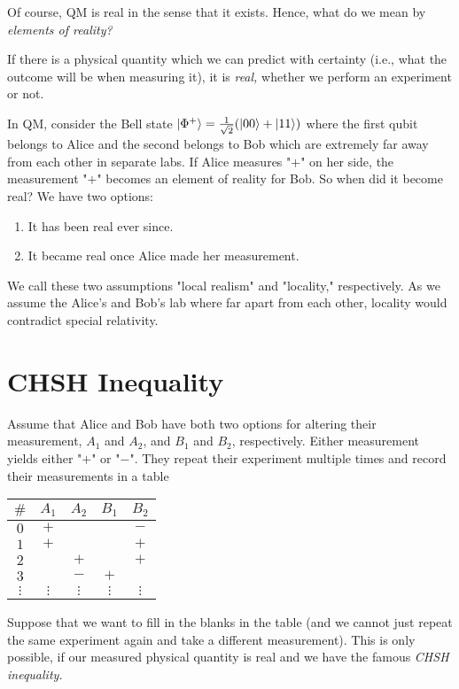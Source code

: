 	Of course, \ac{QM} is real in the sense that it exists. Hence, what do we mean by \emph{elements of reality?}
	\begin{definition}  \label{def:real}
		If there is a physical quantity which we can predict with certainty (i.e., what the outcome will be when measuring it), it is \emph{real,} whether we perform an experiment or not.
	\end{definition}
	In \ac{QM}, consider the Bell state \( \ket{\Phi^+} = \frac{1}{\sqrt{2}} (\ket{00} + \ket{11}) \) where the first qubit belongs to Alice and the second belongs to Bob which are extremely far away from each other in separate labs. If Alice measures "\(+\)" on her side, the measurement "\(+\)" becomes an element of reality for Bob. So when did it become real? We have two options:
	\begin{enumerate}
		\item It has been real ever since.
		\item It became real once Alice made her measurement.
	\end{enumerate}
	We call these two assumptions "local realism" and "locality," respectively. As we assume the Alice's and Bob's lab where far apart from each other, locality would contradict special relativity.

	\section{CHSH Inequality}
		Assume that Alice and Bob have both two options for altering their measurement, \(A_1\) and \(A_2\), and \(B_1\) and \(B_2\), respectively. Either measurement yields either "\(+\)" or "\(-\)". They repeat their experiment multiple times and record their measurements in a table
		\begin{center}
			\begin{tabular}{c|cc|cc}
				  \(\#\)   &  \(A_1\)   &  \(A_2\)   &  \(B_1\)   &  \(B_2\)   \\ \midrule
				  \(0\)    &   \(+\)    &            &            &   \(-\)    \\
				  \(1\)    &   \(+\)    &            &            &   \(+\)    \\
				  \(2\)    &            &   \(+\)    &            &   \(+\)    \\
				  \(3\)    &            &   \(-\)    &   \(+\)    &            \\
				\(\vdots\) & \(\vdots\) & \(\vdots\) & \(\vdots\) & \(\vdots\)
			\end{tabular}
		\end{center}
		Suppose that we want to fill in the blanks in the table (and we cannot just repeat the same experiment again and take a different measurement). This is only possible, if our measured physical quantity is real and we have the famous \emph{CHSH inequality.}


